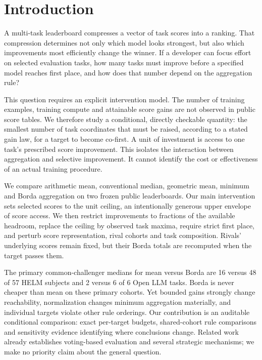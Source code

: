 \section{Introduction}
A multi-task leaderboard compresses a vector of task scores into a ranking. That compression determines not only which model looks strongest, but also which improvements most efficiently change the winner. If a developer can focus effort on selected evaluation tasks, how many tasks must improve before a specified model reaches first place, and how does that number depend on the aggregation rule?

This question requires an explicit intervention model. The number of training examples, training compute and attainable score gains are not observed in public score tables. We therefore study a conditional, directly checkable quantity: the smallest number of task coordinates that must be raised, according to a stated gain law, for a target to become co-first. A unit of investment is access to one task's prescribed score improvement. This isolates the interaction between aggregation and selective improvement. It cannot identify the cost or effectiveness of an actual training procedure.

We compare arithmetic mean, conventional median, geometric mean, minimum and Borda aggregation on two frozen public leaderboards. Our main intervention sets selected scores to the unit ceiling, an intentionally generous upper envelope of score access. We then restrict improvements to fractions of the available headroom, replace the ceiling by observed task maxima, require strict first place, and perturb score representation, rival cohorts and task composition. Rivals' underlying scores remain fixed, but their Borda totals are recomputed when the target passes them.

The primary common-challenger medians for mean versus Borda are 16 versus 48 of 57 HELM subjects and 2 versus 6 of 6 Open LLM tasks. Borda is never cheaper than mean on these primary cohorts. Yet bounded gains strongly change reachability, normalization changes minimum aggregation materially, and individual targets violate other rule orderings. Our contribution is an auditable conditional comparison: exact per-target budgets, shared-cohort rule comparisons and sensitivity evidence identifying where conclusions change. Related work already establishes voting-based evaluation and several strategic mechanisms; we make no priority claim about the general question.
